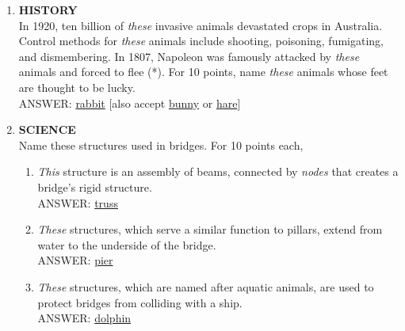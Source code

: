 \documentclass{report}
\newcommand*{\backtrack}{\setcounter{enumi}{\numexpr\theenumi-1\relax}}
\begin{document}
\begin{enumerate}
    \item \textbf{HISTORY} \\ In 1920, ten billion of \textit{these} invasive animals devastated crops in Australia. Control methods for \textit{these} animals include shooting, poisoning, fumigating, and dismembering. In 1807, Napoleon was famously attacked by \textit{these} animals and forced to flee (*). For 10 points, name \textit{these} animals whose feet are thought to be lucky.\\ ANSWER: \underline{rabbit} [also accept \underline{bunny} or \underline{hare}] \backtrack
    \item \textbf{SCIENCE} \\ Name these structures used in bridges. For 10 points each,
    \begin{enumerate}[label=\Alph*]
        \item \textit{This} structure is an assembly of beams, connected by \textit{nodes} that creates a bridge's rigid structure. \\ ANSWER: \underline{truss}
        \item \textit{These} structures, which serve a similar function to pillars, extend from water to the underside of the bridge. \\ ANSWER: \underline{pier}
        \item \textit{These} structures, which are named after aquatic animals, are used to protect bridges from colliding with a ship. \\ ANSWER: \underline{dolphin}
    \end{enumerate}


\end{enumerate}
\end{document}
